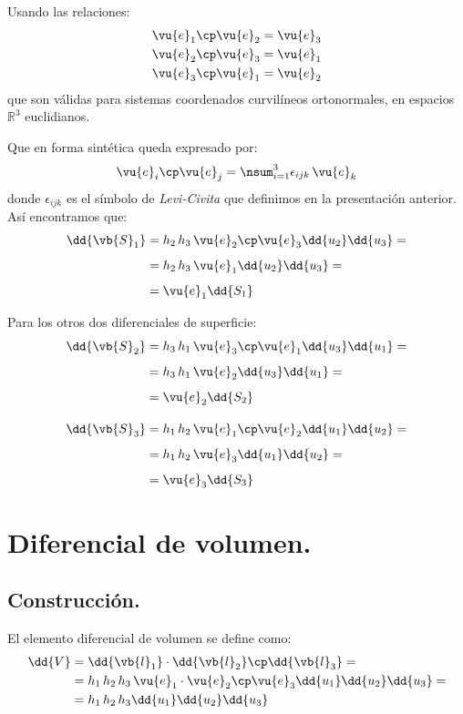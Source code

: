 Usando las relaciones:
\begin{align*}
\vu{e}_{1} \cp \vu{e}_{2} = \vu{e}_{3} \\
\vu{e}_{2} \cp \vu{e}_{3} = \vu{e}_{1} \\
\vu{e}_{3} \cp \vu{e}_{1} = \vu{e}_{2}
\end{align*}
que son válidas para sistemas coordenados curvilíneos ortonormales, en espacios $\mathbb{R}^{3}$ euclidianos.
\par
Que en forma sintética queda expresado por:
\begin{align}
\vu{e}_{i} \cp \vu{e}_{j} = \nsum_{i=1}^{3} \epsilon_{ijk} \, \vu{e}_{k}
\end{align}
donde $\epsilon_{ijk}$ es el símbolo de \emph{Levi-Civita} que definimos en la presentación anterior. Así encontramos que:
\begin{align*}
\dd{\vb{S}_{1}} &= h_{2} \, h_{3} \, \vu{e}_{2} \cp \vu{e}_{3} \dd{u_{2}} \dd{u_{3}} = \\[0.5em]
&= h_{2} \, h_{3} \, \vu{e}_{1} \dd{u_{2}} \dd{u_{3}} = \\[0.5em]
&= \vu{e}_{1} \dd{S_{1}}
\end{align*}

Para los otros dos diferenciales de superficie:
\begin{align*}
\dd{\vb{S}_{2}} &= h_{3} \, h_{1} \, \vu{e}_{3} \cp \vu{e}_{1} \dd{u_{3}} \dd{u_{1}} = \\[0.5em]
&= h_{3} \, h_{1} \, \vu{e}_{2} \dd{u_{3}} \dd{u_{1}} = \\[0.5em]
&= \vu{e}_{2} \dd{S_{2}} \\[1em]
\dd{\vb{S}_{3}} &= h_{1} \, h_{2} \, \vu{e}_{1} \cp \vu{e}_{2} \dd{u_{1}} \dd{u_{2}} = \\[0.5em]
&= h_{1} \, h_{2} \, \vu{e}_{3} \dd{u_{1}} \dd{u_{2}} = \\[0.5em]
&= \vu{e}_{3} \dd{S_{3}}
\end{align*}

\section{Diferencial de volumen.}

\subsection{Construcción.}

El elemento diferencial de volumen se define como:
\begin{align*}
\dd{V} &= \dd{\vb{l}_{1}} \cdot \dd{\vb{l}_{2}} \cp \dd{\vb{l}_{3}} = \\
&= h_{1} \, h_{2} \, h_{3} \, \vu{e}_{1} \cdot \vu{e}_{2} \cp \vu{e}_{3} \dd{u_{1}} \dd{u_{2}} \dd{u_{3}} = \\
&= h_{1} \, h_{2} \, h_{3} \dd{u_{1}} \dd{u_{2}} \dd{u_{3}}
\end{align*}

